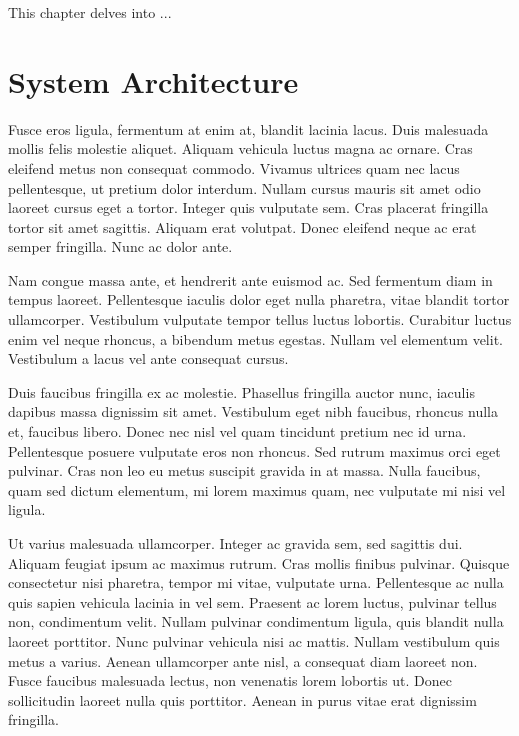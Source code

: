 This chapter delves into ...


\section{System Architecture}
Fusce eros ligula, fermentum at enim at, blandit lacinia lacus. Duis malesuada mollis felis molestie aliquet. Aliquam vehicula luctus magna ac ornare. Cras eleifend metus non consequat commodo. Vivamus ultrices quam nec lacus pellentesque, ut pretium dolor interdum. Nullam cursus mauris sit amet odio laoreet cursus eget a tortor. Integer quis vulputate sem. Cras placerat fringilla tortor sit amet sagittis. Aliquam erat volutpat. Donec eleifend neque ac erat semper fringilla. Nunc ac dolor ante.

Nam congue massa ante, et hendrerit ante euismod ac. Sed fermentum diam in tempus laoreet. Pellentesque iaculis dolor eget nulla pharetra, vitae blandit tortor ullamcorper. Vestibulum vulputate tempor tellus luctus lobortis. Curabitur luctus enim vel neque rhoncus, a bibendum metus egestas. Nullam vel elementum velit. Vestibulum a lacus vel ante consequat cursus.

Duis faucibus fringilla ex ac molestie. Phasellus fringilla auctor nunc, iaculis dapibus massa dignissim sit amet. Vestibulum eget nibh faucibus, rhoncus nulla et, faucibus libero. Donec nec nisl vel quam tincidunt pretium nec id urna. Pellentesque posuere vulputate eros non rhoncus. Sed rutrum maximus orci eget pulvinar. Cras non leo eu metus suscipit gravida in at massa. Nulla faucibus, quam sed dictum elementum, mi lorem maximus quam, nec vulputate mi nisi vel ligula.

Ut varius malesuada ullamcorper. Integer ac gravida sem, sed sagittis dui. Aliquam feugiat ipsum ac maximus rutrum. Cras mollis finibus pulvinar. Quisque consectetur nisi pharetra, tempor mi vitae, vulputate urna. Pellentesque ac nulla quis sapien vehicula lacinia in vel sem. Praesent ac lorem luctus, pulvinar tellus non, condimentum velit. Nullam pulvinar condimentum ligula, quis blandit nulla laoreet porttitor. Nunc pulvinar vehicula nisi ac mattis. Nullam vestibulum quis metus a varius. Aenean ullamcorper ante nisl, a consequat diam laoreet non. Fusce faucibus malesuada lectus, non venenatis lorem lobortis ut. Donec sollicitudin laoreet nulla quis porttitor. Aenean in purus vitae erat dignissim fringilla.

